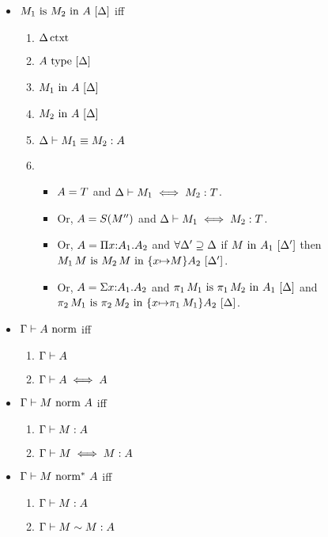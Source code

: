 \documentclass{article}
\theoremstyle{break}
\begin{document}
\begin{itemize}
\item $\semanticequivterm{\world}{\constructor_1}{\constructor_2}{\kind}$ iff
\begin{enumerate}
\item $\semanticcontext{\world}$
\item $\semanticvalidtype{\world}{\kind}$
\item $\semanticvalidterm{\world}{\constructor_1}{\kind}$
\item $\semanticvalidterm{\world}{\constructor_2}{\kind}$
\item $\equivconstructor{\world}{\constructor_1}{\constructor_2}{\kind}$
\item
\begin{itemize}{}
\item $\kind = \ktype$ and 
$\aconequiv{\world}{\constructor_1}{\constructor_2}{\ktype}$.
\item Or, $\kind = \ksingleton{\constructor''}$ and 
$\aconequiv{\world}{\constructor_1}{\constructor_2}{\ktype}$.
\item Or, $\kind = \kpi{\cvar}{\kind_1}{\kind_2}$ and
$\forall \world'\supseteq\world$ if $\semanticvalidterm{\world'}{\constructor}{\kind_1}$
then $\semanticequivterm{\world'}{\capply{\constructor_1}{\constructor}}{\capply{\constructor_2}{\constructor}}{\substitute{\cvar}{\constructor}{\kind_2}}$.
\item Or, $\kind = \ksigma{\cvar}{\kind_1}{\kind_2}$ and
$\semanticequivterm{\world}{\cpi{1}{\constructor_1}}{\cpi{1}{\constructor_2}}{\kind_1}$ and
$\semanticequivterm{\world}{\cpi{2}{\constructor_1}}{\cpi{2}{\constructor_2}}{\substitute{\cvar}{\cpi{1}{\constructor_1}}{\kind_2}}$.
\end{itemize}
\end{enumerate}

\item $\normtype{\context}{\kind}$ iff
\begin{enumerate}{}
\item $\validkind{\context}{\kind}$
\item $\akindequiv{\context}{\kind}{\kind}$
\end{enumerate}

\item $\normterm{\context}{\constructor}{\kind}$ iff
\begin{enumerate}
\item $\validconstructor{\context}{\constructor}{\kind}$
\item $\aconequiv{\context}{\constructor}{\constructor}{\kind}$
\end{enumerate}

\item $\normE{\context}{\constructor}{\kind}$ iff
\begin{enumerate}
\item $\validconstructor{\context}{\constructor}{\kind}$
\item $\weakconequiv{\context}{\constructor}{\constructor}{\kind}$
\end{enumerate}

\end{itemize}
\end{document}
